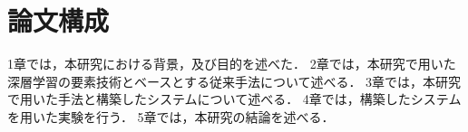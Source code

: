 

\section{論文構成}
1章では，本研究における背景，及び目的を述べた．
2章では，本研究で用いた深層学習の要素技術とベースとする従来手法について述べる．
3章では，本研究で用いた手法と構築したシステムについて述べる．
4章では，構築したシステムを用いた実験を行う．
5章では，本研究の結論を述べる．
